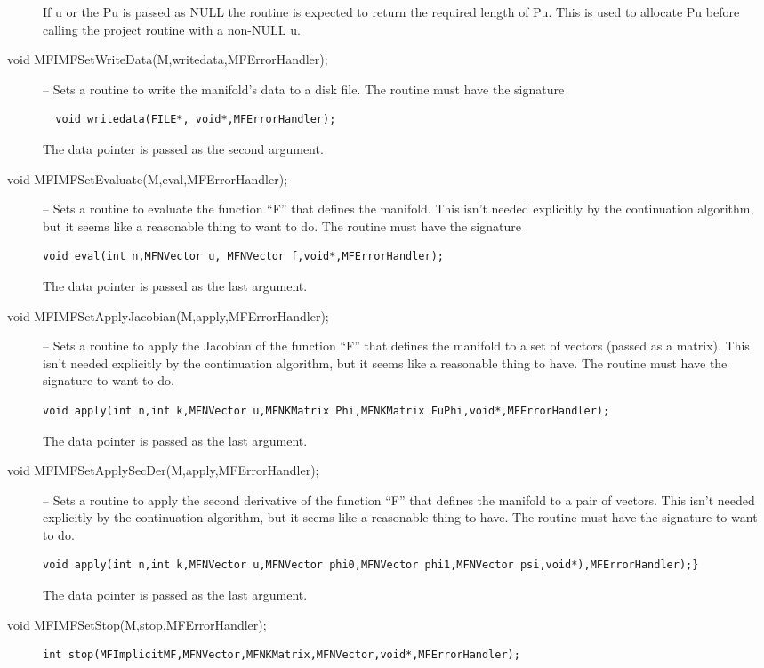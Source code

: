 \documentclass[12pt]{article}
\begin{document}
\begin{description}
If u or the Pu is passed as NULL the routine is expected to return the required length of 
Pu. This is used to allocate Pu before calling the project routine with a non-NULL u.
\item [void MFIMFSetWriteData(M,writedata,MFErrorHandler);]
-- Sets a routine to write the manifold's data to a disk file. The routine must have the signature
\begin{verbatim}
  void writedata(FILE*, void*,MFErrorHandler);
\end{verbatim}
The data pointer is passed as the second argument.
\item [void MFIMFSetEvaluate(M,eval,MFErrorHandler);]
-- Sets a routine to evaluate the function ``F'' that defines the manifold. This isn't 
needed explicitly by the continuation algorithm, but it seems like a reasonable thing
to want to do.
The routine must have the signature
\begin{verbatim}
void eval(int n,MFNVector u, MFNVector f,void*,MFErrorHandler);
\end{verbatim}
The data pointer is passed as the last argument.
\item [void MFIMFSetApplyJacobian(M,apply,MFErrorHandler);]
-- Sets a routine to apply the Jacobian of the function ``F'' that defines the manifold to a
set of vectors (passed as a matrix).
This isn't
needed explicitly by the continuation algorithm, but it seems like a reasonable thing to have.
The routine must have the signature
to want to do.
\begin{verbatim}
void apply(int n,int k,MFNVector u,MFNKMatrix Phi,MFNKMatrix FuPhi,void*,MFErrorHandler);
\end{verbatim}
The data pointer is passed as the last argument.
\item [void MFIMFSetApplySecDer(M,apply,MFErrorHandler);]
-- Sets a routine to apply the second derivative of the function ``F'' that defines the manifold to a
pair of vectors.
This isn't
needed explicitly by the continuation algorithm, but it seems like a reasonable thing to have.
The routine must have the signature
to want to do.
\begin{verbatim}
void apply(int n,int k,MFNVector u,MFNVector phi0,MFNVector phi1,MFNVector psi,void*),MFErrorHandler);}
\end{verbatim}
The data pointer is passed as the last argument.
\item [void MFIMFSetStop(M,stop,MFErrorHandler);]
\begin{verbatim}
int stop(MFImplicitMF,MFNVector,MFNKMatrix,MFNVector,void*,MFErrorHandler);

\end{verbatim}
\end{description}
\end{document}
